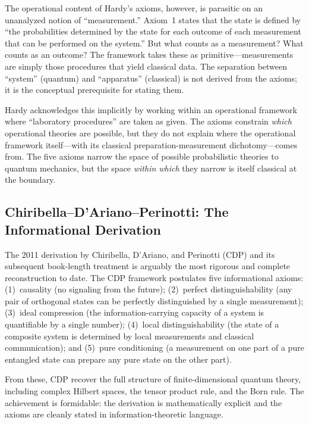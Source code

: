\documentclass[12pt,a4paper,twoside]{article}
\begin{document}
The operational content of Hardy's axioms, however, is parasitic on an unanalyzed notion of ``measurement.'' Axiom~1 states that the state is defined by ``the probabilities determined by the state for each outcome of each measurement that can be performed on the system.'' But what counts as a measurement? What counts as an outcome? The framework takes these as primitive---measurements are simply those procedures that yield classical data. The separation between ``system'' (quantum) and ``apparatus'' (classical) is not derived from the axioms; it is the conceptual prerequisite for stating them.

Hardy acknowledges this implicitly by working within an operational framework where ``laboratory procedures'' are taken as given. The axioms constrain \emph{which} operational theories are possible, but they do not explain where the operational framework itself---with its classical preparation-measurement dichotomy---comes from. The five axioms narrow the space of possible probabilistic theories to quantum mechanics, but the space \emph{within which} they narrow is itself classical at the boundary.

\subsection{Chiribella--D'Ariano--Perinotti: The Informational Derivation}

The 2011 derivation by Chiribella, D'Ariano, and Perinotti (CDP) \cite{Chiribella2011} and its subsequent book-length treatment \cite{DAriano2017} is arguably the most rigorous and complete reconstruction to date. The CDP framework postulates five informational axioms: (1)~causality (no signaling from the future); (2)~perfect distinguishability (any pair of orthogonal states can be perfectly distinguished by a single measurement); (3)~ideal compression (the information-carrying capacity of a system is quantifiable by a single number); (4)~local distinguishability (the state of a composite system is determined by local measurements and classical communication); and (5)~pure conditioning (a measurement on one part of a pure entangled state can prepare any pure state on the other part).

From these, CDP recover the full structure of finite-dimensional quantum theory, including complex Hilbert spaces, the tensor product rule, and the Born rule. The achievement is formidable: the derivation is mathematically explicit and the axioms are cleanly stated in information-theoretic language.
\end{document}
